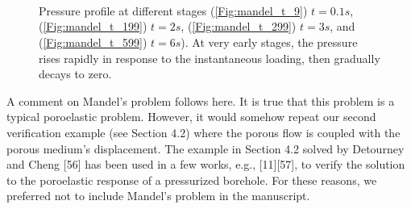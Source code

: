 \documentclass{elsarticle}
\begin{document}
	\begin{figure}[]
		\centering %
		\\
		\\
		\\
		\caption{Pressure profile at different stages (\ref{Fig:mandel_t_9}) $t=0.1s$, (\ref{Fig:mandel_t_199}) $t=2s$, (\ref{Fig:mandel_t_299}) $t=3s$, and (\ref{Fig:mandel_t_599}) $t=6s$). At very early stages, the pressure rises  rapidly in response to the instantaneous loading, then gradually decays to zero. %
		}
		\label{Fig:mandel_snapshots}
	\end{figure}

A comment on Mandel's problem follows here.	
It is true that this problem is a typical poroelastic problem. However, it would somehow repeat our second verification example (see Section 4.2) where the porous flow is coupled with the porous medium's displacement. The example in Section 4.2 solved by Detourney and Cheng [56] has been used in a few works, e.g., [11][57], to verify the solution to the poroelastic response of a pressurized borehole. For these reasons, we preferred not to include Mandel's problem in the manuscript. 
		
\end{document}
